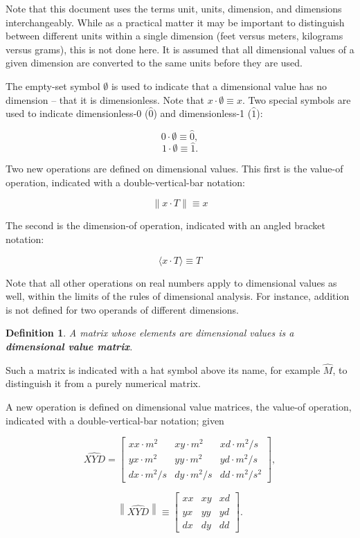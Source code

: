 \documentclass[10pt,letterpaper]{article}
\newtheorem{defn}{Definition}[section]
\numberwithin{equation}{section}
\begin{document}
Note that this document uses the terms unit, units, dimension, and dimensions
interchangeably.  While as a practical matter it may be important to
distinguish between different units within a single dimension (feet versus
meters, kilograms versus grams), this is not done here.  It is assumed that
all dimensional values of a given dimension are converted to the same units
before they are used.
 
The empty-set symbol $\emptyset$ is used to indicate that a
dimensional value has no dimension – that it is dimensionless.  Note
that $x \cdot \emptyset \equiv x$.  Two special symbols are used to
indicate dimensionless-0 ($\hat 0$) and dimensionless-1 ($\hat 1$):
 
 \[ 0 \cdot \emptyset \equiv \hat 0, \]
 \[ 1 \cdot \emptyset \equiv \hat 1. \]

Two new operations are defined on dimensional values.  This first is
the value-of operation, indicated with a double-vertical-bar
notation:

\[ \| x \cdot T \| \equiv x \]

The second is the dimension-of operation, indicated with an angled
bracket notation:

\[ \langle x \cdot T \rangle \equiv T \]

Note that all other operations on real numbers apply to dimensional
values as well, within the limits of the rules of dimensional
analysis.  For instance, addition is not defined for two operands of
different dimensions.


\begin{defn}A matrix whose elements are dimensional values is a
  \textbf{dimensional value matrix}.\end{defn}

Such a matrix is indicated with a hat symbol above its name, for
example $\hat M$, to distinguish it from a purely numerical matrix.

A new operation is defined on dimensional value matrices, the value-of
operation, indicated with a double-vertical-bar notation; given

\[ \widehat{XYD} = \left[ \begin{matrix} 
  xx \cdot m^2 & xy \cdot m^2 & xd \cdot m^2/s \\
  yx \cdot m^2 & yy \cdot m^2 & yd \cdot m^2/s \\
  dx \cdot m^2/s & dy \cdot m^2/s & dd \cdot m^2/s^2
 \end{matrix} \right], \]
 
 \[ \left\| \widehat{XYD} \right\| \equiv \left[ \begin{matrix} 
  xx & xy & xd \\
  yx & yy & yd \\
  dx & dy & dd
 \end{matrix} \right]. \]
 
\end{document}
